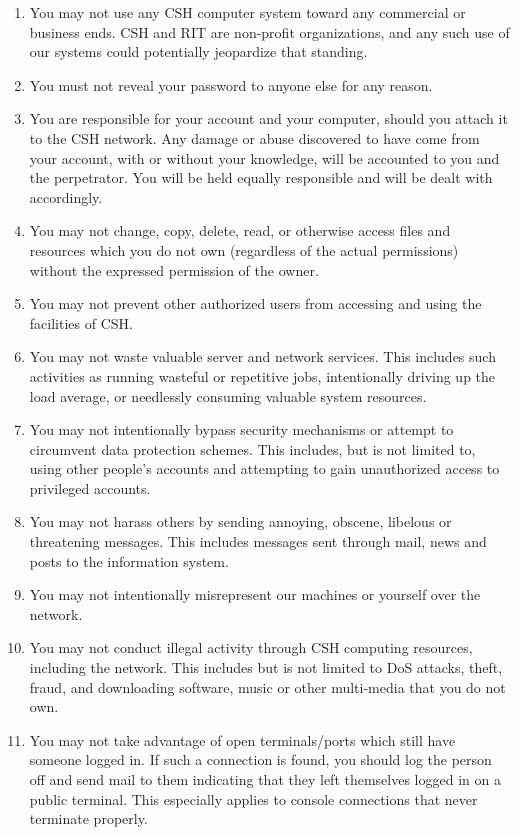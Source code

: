 \documentclass{article}
\begin{document}
\begin{enumerate}[I]
\item You may not use any CSH computer system toward any commercial or business ends. CSH and RIT are non-profit organizations, and any such use of our systems could potentially jeopardize that standing.
\item You must not reveal your password to anyone else for any reason.
\item You are responsible for your account and your computer, should you attach it to the CSH network. Any damage or abuse discovered to have come from your account, with or without your knowledge, will be accounted to you and the perpetrator. You will be held equally responsible and will be dealt with accordingly.
\item You may not change, copy, delete, read, or otherwise access files and resources which you do not own (regardless of the actual permissions) without the expressed permission of the owner.
\item You may not prevent other authorized users from accessing and using the facilities of CSH.
\item You may not waste valuable server and network services. This includes such activities as running wasteful or repetitive jobs, intentionally driving up the load average, or needlessly consuming valuable system resources.
\item You may not intentionally bypass security mechanisms or attempt to circumvent data protection schemes. This includes, but is not limited to, using other people’s accounts and attempting to gain unauthorized access to privileged accounts.
\item You may not harass others by sending annoying, obscene, libelous or threatening messages. This includes messages sent through mail, news and posts to the information system.
\item You may not intentionally misrepresent our machines or yourself over the network.
\item You may not conduct illegal activity through CSH computing resources, including the network. This includes but is not limited to DoS attacks, theft, fraud, and downloading software, music or other multi-media that you do not own.
\item You may not take advantage of open terminals/ports which still have someone logged in. If such a connection is found, you should log the person off and send mail to them indicating that they left themselves logged in on a public terminal. This especially applies to console connections that never terminate properly.

\end{enumerate}
\end{document}
